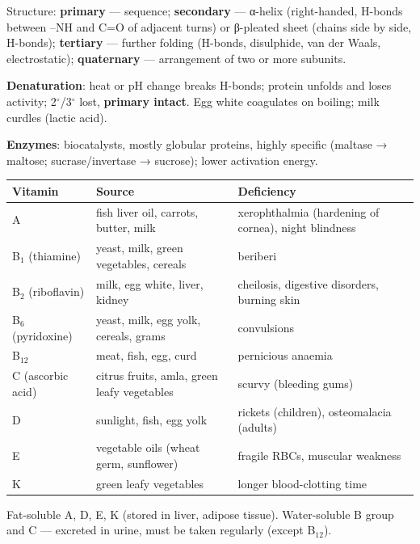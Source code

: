 \documentclass[9pt,a4paper]{extarticle}
\begin{document}
\begin{multicols}{2}
\begin{fl}
\item Structure: \textbf{primary} — sequence; \textbf{secondary} — α-helix (right-handed, H-bonds between --NH and C=O of adjacent turns) or β-pleated sheet (chains side by side, H-bonds); \textbf{tertiary} — further folding (H-bonds, disulphide, van der Waals, electrostatic); \textbf{quaternary} — arrangement of two or more subunits.
\item \textbf{Denaturation}: heat or pH change breaks H-bonds; protein unfolds and loses activity; 2$^\circ$/3$^\circ$ lost, \textbf{primary intact}. Egg white coagulates on boiling; milk curdles (lactic acid).
\item \textbf{Enzymes}: biocatalysts, mostly globular proteins, highly specific (maltase → maltose; sucrase/invertase → sucrose); lower activation energy.
\end{fl}
{\scriptsize\setlength{\tabcolsep}{2pt}
\begin{tabularx}{\linewidth}{@{}l Y Y@{}}
\toprule
\textbf{Vitamin} & \textbf{Source} & \textbf{Deficiency}\\
\midrule
A & fish liver oil, carrots, butter, milk & xerophthalmia (hardening of cornea), night blindness\\
B$_1$ (thiamine) & yeast, milk, green vegetables, cereals & beriberi\\
B$_2$ (riboflavin) & milk, egg white, liver, kidney & cheilosis, digestive disorders, burning skin\\
B$_6$ (pyridoxine) & yeast, milk, egg yolk, cereals, grams & convulsions\\
B$_{12}$ & meat, fish, egg, curd & pernicious anaemia\\
C (ascorbic acid) & citrus fruits, amla, green leafy vegetables & scurvy (bleeding gums)\\
D & sunlight, fish, egg yolk & rickets (children), osteomalacia (adults)\\
E & vegetable oils (wheat germ, sunflower) & fragile RBCs, muscular weakness\\
K & green leafy vegetables & longer blood-clotting time\\
\bottomrule
\end{tabularx}\par}
\begin{fl}
\item Fat-soluble A, D, E, K (stored in liver, adipose tissue). Water-soluble B group and C — excreted in urine, must be taken regularly (except B$_{12}$).
\end{fl}

\end{multicols}
\end{document}
